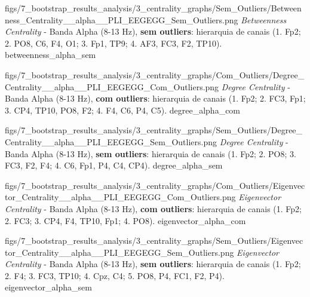 \ultrawidefigure
{figs/7_bootstrap_results_analysis/3_centrality_graphs/Sem_Outliers/Betweenness_Centrality__alpha__PLI_EEGEGG_Sem_Outliers.png}
{\textit{Betweenness Centrality} - Banda Alpha (8-13 Hz), \textbf{sem outliers}: hierarquia de canais (1. Fp2; 2. PO8, C6, F4, O1; 3. Fp1, TP9; 4. AF3, FC3, F2, TP10).}
{betweenness_alpha_sem}


\ultrawidefigure
{figs/7_bootstrap_results_analysis/3_centrality_graphs/Com_Outliers/Degree_Centrality__alpha__PLI_EEGEGG_Com_Outliers.png}
{\textit{Degree Centrality} - Banda Alpha (8-13 Hz), \textbf{com outliers}: hierarquia de canais (1. Fp2; 2. FC3, Fp1; 3. CP4, TP10, PO8, F2; 4. F4, C6, P4, C5).}
{degree_alpha_com}

\ultrawidefigure
{figs/7_bootstrap_results_analysis/3_centrality_graphs/Sem_Outliers/Degree_Centrality__alpha__PLI_EEGEGG_Sem_Outliers.png}
{\textit{Degree Centrality} - Banda Alpha (8-13 Hz), \textbf{sem outliers}: hierarquia de canais (1. Fp2; 2. PO8; 3. FC3, F2, F4; 4. C6, Fp1, P4, C4, CP4).}
{degree_alpha_sem}


\ultrawidefigure
{figs/7_bootstrap_results_analysis/3_centrality_graphs/Com_Outliers/Eigenvector_Centrality__alpha__PLI_EEGEGG_Com_Outliers.png}
{\textit{Eigenvector Centrality} - Banda Alpha (8-13 Hz), \textbf{com outliers}: hierarquia de canais (1. Fp2; 2. FC3; 3. CP4, F4, TP10, Fp1; 4. PO8).}
{eigenvector_alpha_com}

\ultrawidefigure
{figs/7_bootstrap_results_analysis/3_centrality_graphs/Sem_Outliers/Eigenvector_Centrality__alpha__PLI_EEGEGG_Sem_Outliers.png}
{\textit{Eigenvector Centrality} - Banda Alpha (8-13 Hz), \textbf{sem outliers}: hierarquia de canais (1. Fp2; 2. F4; 3. FC3, TP10; 4. Cpz, C4; 5. PO8, P4, FC1, F2, P4).}
{eigenvector_alpha_sem}



